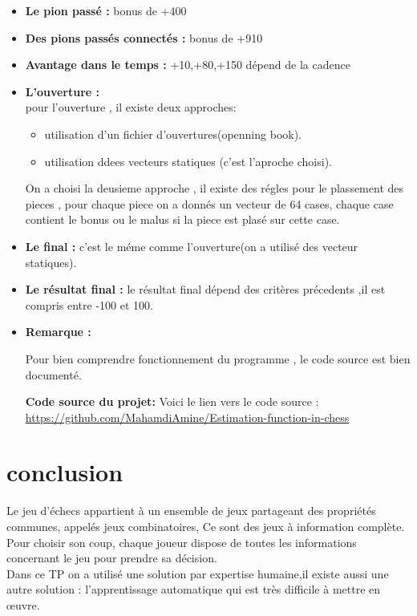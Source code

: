 \documentclass[12pt]{report}
\begin{document}
\begin{itemize}
	\item \textbf{Le pion passé :} bonus de +400\\
	\item \textbf{Des pions passés connectés :} bonus de +910 \\
	\item \textbf{Avantage dans le temps :} {+10,+80,+150} dépend de la cadence\\
	\item \textbf{L'ouverture :} \\
	pour l'ouverture , il existe deux approches:
	\begin{itemize}
		\item utilisation d'un fichier d'ouvertures(openning book).
		\item utilisation ddees vecteurs statiques (c'est l'aproche choisi).
	\end{itemize}
	On a choisi la deusieme approche , il existe des régles pour le plassement des pieces , pour chaque piece on a donnés un vecteur de 64 cases, chaque case contient le bonus ou le malus si la piece est plasé sur cette case.
	\item \textbf{Le final :} c'est le méme comme l'ouverture(on a utilisé des vecteur statiques). \\  
	\item \textbf{Le résultat final :} le résultat final dépend des critères précedents ,il est compris entre -100 et 100.
	 \item \textbf{Remarque :} 
	\par{}
	Pour bien comprendre fonctionnement du programme  , le code source est bien documenté.
	\par{}
	\textbf{Code source du projet: } 
	\newline
	Voici  le lien vers le code source :
	\newline
	\href{https://github.com/MahamdiAmine/Estimation-function-in-chess}{https://github.com/MahamdiAmine/Estimation-function-in-chess}
\end{itemize}	
\chapter{conclusion}
Le jeu d’échecs appartient à un ensemble de jeux partageant des propriétés communes,
appelés jeux combinatoires, Ce sont des jeux à information complète. \\

Pour choisir son coup, chaque joueur dispose de toutes les informations concernant le jeu pour prendre sa décision.
\\

Dans ce TP on a utilisé une solution par expertise humaine,il existe aussi une autre solution : l'apprentissage automatique qui est très difficile à mettre en œuvre.
\\
\end{document}

